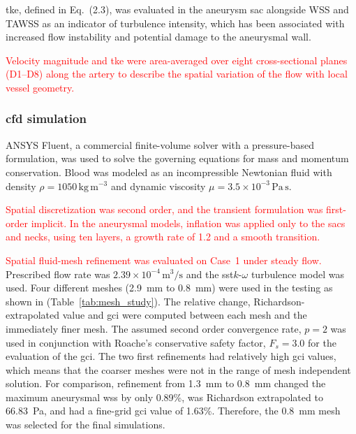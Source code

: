 \documentclass[12pt,a4paper]{article}
\newcommand{\cfdrevision}[1]{\textcolor{red}{#1}}
\newcommand{\WSS}{\ac{wss}\xspace}
\newcommand{\TKE}{\ac{tke}\xspace}
\newcommand{\SST}{\ac{sst}\xspace}
\newcommand{\GCI}{\ac{gci}\xspace}
\newcommand{\CFDcap}{\Ac{cfd}\xspace}
\newcommand{\TKEcap}{\Ac{tke}\xspace}
\theoremstyle{definition}
\numberwithin{equation}{section}
\newcommand{\revision}[1]{\textcolor{red}{#1}}
\begin{document}
\TKEcap, defined in Eq.~(2.3), was evaluated in the aneurysm sac alongside WSS and TAWSS as an indicator of turbulence intensity, which has been associated with increased flow instability and potential damage to the aneurysmal wall.

  \revision{\cfdrevision{Velocity magnitude and \TKE were area-averaged over eight cross-sectional planes (D1--D8) along the artery to describe the spatial variation of the flow with local vessel geometry.}
}

\subsubsection{\label{CFD Simulation}\texorpdfstring{\CFDcap}{CFD} simulation}ANSYS Fluent, a commercial finite-volume solver with a pressure-based formulation, was used to solve the governing equations for mass and momentum conservation. Blood was modeled as an incompressible Newtonian fluid with density \(\rho = 1050\,\mathrm{kg\,m^{-3}}\) and dynamic viscosity \(\mu = 3.5 \times 10^{-3}\,\mathrm{Pa\,s}\).

  \revision{\cfdrevision{Spatial discretization was second order, and the transient formulation was first-order implicit. In the aneurysmal models, inflation was applied only to the sacs and necks, using ten layers, a growth rate of 1.2 and a smooth transition.}
}

\revision{\cfdrevision{Spatial fluid-mesh refinement was evaluated on Case~1 under steady flow.} } Prescribed flow rate was \(2.39 \times 10^{-4} \, \mathrm{m^3/s}\) and the \SST \(k\)-\(\omega\) turbulence model was used. Four different meshes (2.9~mm to 0.8~mm) were used in the testing as shown in (Table~\ref{tab:mesh_study}). The relative change, Richardson-extrapolated value and \GCI were computed between each mesh and the immediately finer mesh. The assumed second order convergence rate, $p=2$ was used in conjunction with Roache's conservative safety factor, $F_s=3.0$ for the evaluation of the \GCI. The two first refinements had relatively high \GCI values, which means that the coarser meshes were not in the range of mesh independent solution. For comparison, refinement from 1.3~mm to 0.8~mm changed the maximum aneurysmal \WSS by only 0.89\%, was Richardson extrapolated to 66.83~Pa, and had a fine-grid \GCI value of 1.63\%. Therefore, the 0.8~mm mesh was selected for the final simulations.
\end{document}
